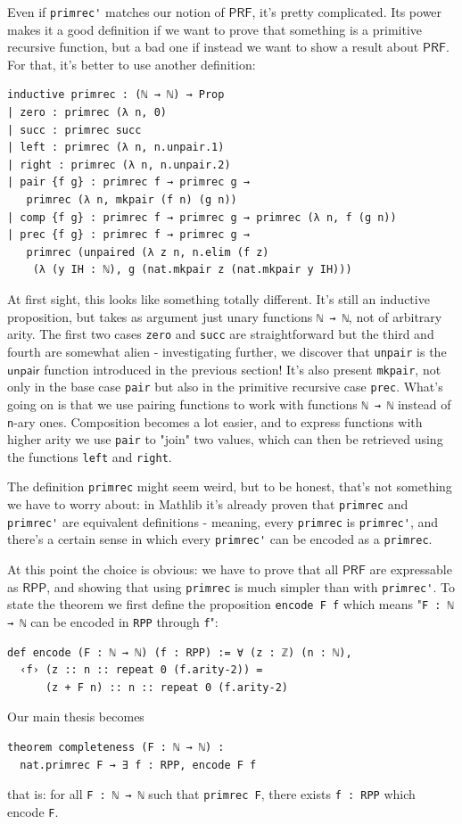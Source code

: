 \documentclass[oneside]{book}
\theoremstyle{definition}
\theoremstyle{remark}
\theoremstyle{plain}
\newcommand{\RPP}{\mathsf{RPP}}
\newcommand{\rppunpair}{\mathsf{unpair}}
\newcommand{\PRF}{\mathsf{PRF}}
\begin{document}
Even if \lstinline{primrec'} matches our notion of $\PRF$, it's pretty complicated.
Its power makes it a good definition if we want to prove that something is a primitive recursive function,
but a bad one if instead we want to show a result about $\PRF$.
For that, it's better to use another definition:
\begin{lstlisting}
inductive primrec : (ℕ → ℕ) → Prop
| zero : primrec (λ n, 0)
| succ : primrec succ
| left : primrec (λ n, n.unpair.1)
| right : primrec (λ n, n.unpair.2)
| pair {f g} : primrec f → primrec g →
   primrec (λ n, mkpair (f n) (g n))
| comp {f g} : primrec f → primrec g → primrec (λ n, f (g n))
| prec {f g} : primrec f → primrec g →
   primrec (unpaired (λ z n, n.elim (f z)
    (λ (y IH : ℕ), g (nat.mkpair z (nat.mkpair y IH)))
\end{lstlisting}
At first sight, this looks like something totally different.
It's still an inductive proposition, but takes as argument just unary functions \lstinline{ℕ → ℕ}, not of arbitrary arity.
The first two cases \lstinline{zero} and \lstinline{succ} are straightforward but the third and fourth are somewhat alien -
investigating further, we discover that \lstinline{unpair} is the $\rppunpair$ function introduced in the previous section!
It's also present \lstinline{mkpair}, not only in the base case \lstinline{pair} but also in the primitive recursive case \lstinline{prec}.
What's going on is that we use pairing functions to work with functions \lstinline{ℕ → ℕ} instead of \lstinline{n}-ary ones.
Composition becomes a lot easier, and to express functions with higher arity we use \lstinline{pair} to "join" two values,
which can then be retrieved using the functions \lstinline{left} and \lstinline{right}.

The definition \lstinline{primrec} might seem weird, but to be honest, that's not something we have to worry about:
in Mathlib it's already proven that \lstinline{primrec} and \lstinline{primrec'} are equivalent definitions - meaning,
every \lstinline{primrec} is \lstinline{primrec'},
and there's a certain sense in which every \lstinline{primrec'} can be encoded as a \lstinline{primrec}.

At this point the choice is obvious: we have to prove that all $\PRF$ are expressable as $\RPP$,
and showing that using \lstinline{primrec} is much simpler than with \lstinline{primrec'}.
To state the theorem we first define the proposition \lstinline{encode F f} which means
"\lstinline{F : ℕ → ℕ} can be encoded in \lstinline{RPP} through \lstinline{f}":
\begin{lstlisting}
def encode (F : ℕ → ℕ) (f : RPP) := ∀ (z : ℤ) (n : ℕ),
  ‹f› (z :: n :: repeat 0 (f.arity-2)) =
      (z + F n) :: n :: repeat 0 (f.arity-2)
\end{lstlisting}
Our main thesis becomes
\begin{lstlisting}
theorem completeness (F : ℕ → ℕ) :
  nat.primrec F → ∃ f : RPP, encode F f
\end{lstlisting}
that is: for all \lstinline{F : ℕ → ℕ} such that \lstinline{primrec F},
there exists \lstinline{f : RPP} which encode \lstinline{F}.
\end{document}
